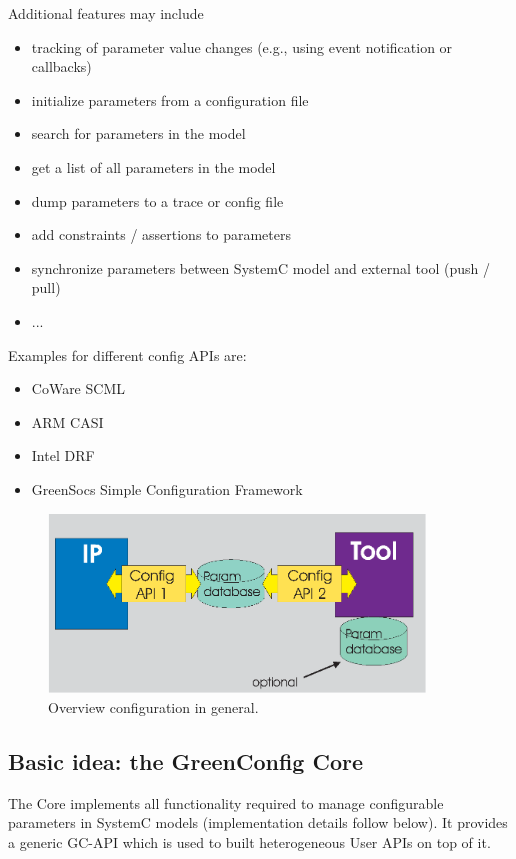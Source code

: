 Additional features may include 

\begin{itemize}
	\item tracking of parameter value changes (e.g., using event notification or callbacks) 
	\item initialize parameters from a configuration file 
	\item search for parameters in the model 
	\item get a list of all parameters in the model 
	\item dump parameters to a trace or config file 
	\item add constraints / assertions to parameters 
	\item synchronize parameters between SystemC model and external tool (push / pull) 
	\item ... 
\end{itemize}

Examples for different config APIs are: 

\begin{itemize}
	\item CoWare SCML 
	\item ARM CASI \item Intel DRF \item GreenSocs Simple Configuration Framework 
\end{itemize}

\begin{figure}[H]%
	\centerline{
		\includegraphics[width=10cm]{requirements_API_overview.eps}} 
	\caption{Overview configuration in general.}
	\label{fig:overviewAPIrequ}
\end{figure}



\subsection{Basic idea: the GreenConfig Core}
The \GreenConfig Core implements all functionality required to manage configurable parameters in SystemC models (implementation details follow below). It provides a generic GC-API which is used to built heterogeneous User APIs on top of it.  

